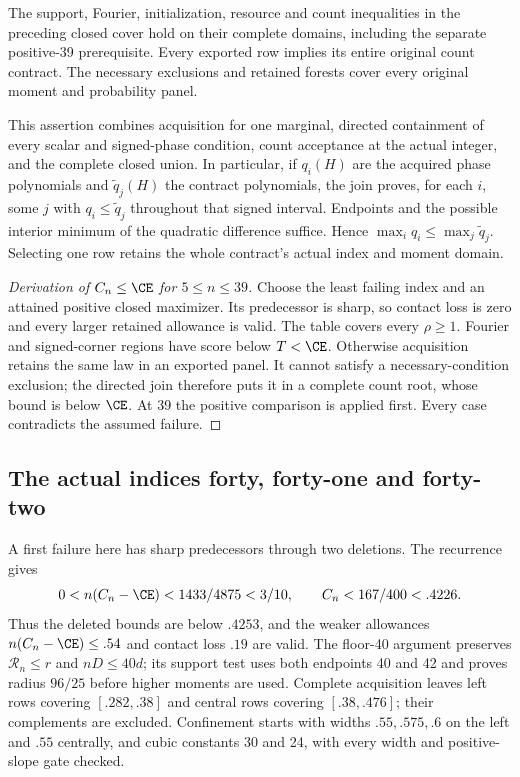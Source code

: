 \begin{proposition}
\label{j:finite:numerical539}
The support, Fourier, initialization, resource and count inequalities
in the preceding closed cover hold on their complete domains, including
the separate positive-39 prerequisite. Every exported row implies its
entire original count contract. The necessary exclusions and retained
forests cover every original moment and probability panel.
\end{proposition}
This assertion combines acquisition for one marginal, directed
containment of every scalar and signed-phase condition, count acceptance
at the actual integer, and the complete closed union. In particular,
if $q_i(H)$ are the acquired phase polynomials and
$\widetilde q_j(H)$ the contract polynomials, the join proves, for each
$i$, some $j$ with $q_i\le\widetilde q_j$ throughout that signed interval.
Endpoints and the possible interior minimum of the quadratic difference
suffice. Hence $\max_iq_i\le\max_j\widetilde q_j$. Selecting one row
retains the whole contract's actual index and moment domain.

\begin{proof}[Derivation of $C_n\le\CE$ for $5\le n\le39$]
Choose the least failing index and an attained positive closed maximizer.
Its predecessor is sharp, so contact loss is zero and every larger
retained allowance is valid. The table covers every $\rho\ge1$.
Fourier and signed-corner regions have score below $T<\CE$.
Otherwise acquisition retains the same law in an exported panel.
It cannot satisfy a necessary-condition exclusion; the directed join
therefore puts it in a complete count root, whose bound is below $\CE$.
At 39 the positive comparison is applied first. Every case contradicts
the assumed failure.
\end{proof}

\subsection{The actual indices forty, forty-one and forty-two}
\label{j:finite:4042}
A first failure here has sharp predecessors through two deletions.
The recurrence gives
\[
 0<n(C_n-\CE)<1433/4875<3/10,\qquad C_n<167/400<.4226.
\]
Thus the deleted bounds are below $.4253$, and the weaker allowances
$n(C_n-\CE)\le.54$ and contact loss $.19$ are valid.
The floor-40 argument preserves $\mathcal R_n\le r$ and $nD\le40d$;
its support test uses both endpoints 40 and 42 and proves radius $96/25$
before higher moments are used. Complete acquisition leaves left rows
covering $[.282,.38]$ and central rows covering $[.38,.476]$; their
complements are excluded. Confinement starts with widths
$.55,.575,.6$ on the left and $.55$ centrally, and cubic constants
30 and 24, with every width and positive-slope gate checked.

